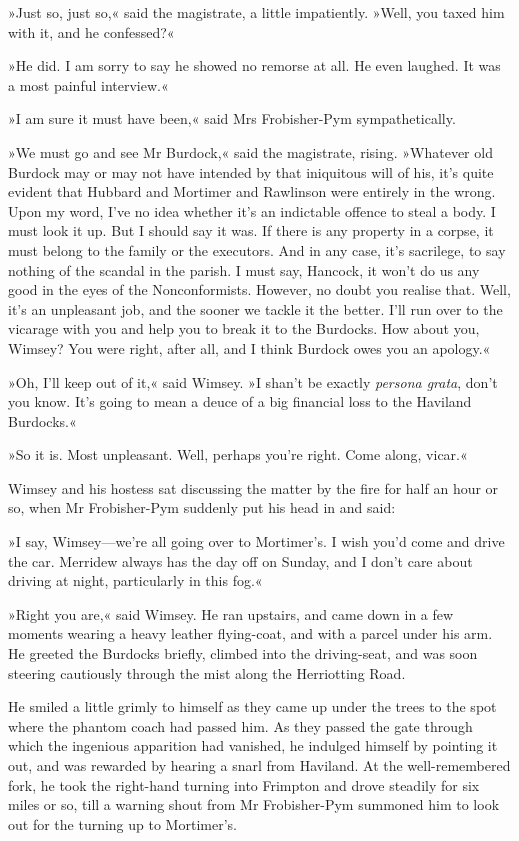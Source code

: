 »Just so, just so,« said the magistrate, a little impatiently. »Well, you taxed him with it, and he confessed?«

»He did. I am sorry to say he showed no remorse at all. He even laughed. It was a most painful interview.«

»I am sure it must have been,« said Mrs Frobisher-Pym sympathetically.

»We must go and see Mr Burdock,« said the magistrate, rising. »Whatever old Burdock may or may not have intended by that iniquitous will of his, it's quite evident that Hubbard and Mortimer and Rawlinson were entirely in the wrong. Upon my word, I've no idea whether it's an indictable offence to steal a body. I must look it up. But I should say it was. If there is any property in a corpse, it must belong to the family or the executors. And in any case, it's sacrilege, to say nothing of the scandal in the parish. I must say, Hancock, it won't do us any good in the eyes of the Nonconformists. However, no doubt you realise that. Well, it's an unpleasant job, and the sooner we tackle it the better. I'll run over to the vicarage with you and help you to break it to the Burdocks. How about you, Wimsey? You were right, after all, and I think Burdock owes you an apology.«

»Oh, I'll keep out of it,« said Wimsey. »I shan't be exactly \textit{persona grata}, don't you know. It's going to mean a deuce of a big financial loss to the Haviland Burdocks.«

»So it is. Most unpleasant. Well, perhaps you're right. Come along, vicar.«

Wimsey and his hostess sat discussing the matter by the fire for half an hour or so, when Mr Frobisher-Pym suddenly put his head in and said:

»I say, Wimsey—we're all going over to Mortimer's. I wish you'd come and drive the car. Merridew always has the day off on Sunday, and I don't care about driving at night, particularly in this fog.«

»Right you are,« said Wimsey. He ran upstairs, and came down in a few moments wearing a heavy leather flying-coat, and with a parcel under his arm. He greeted the Burdocks briefly, climbed into the driving-seat, and was soon steering cautiously through the mist along the Herriotting Road.

He smiled a little grimly to himself as they came up under the trees to the spot where the phantom coach had passed him. As they passed the gate through which the ingenious apparition had vanished, he indulged himself by pointing it out, and was rewarded by hearing a snarl from Haviland. At the well-remembered fork, he took the right-hand turning into Frimpton and drove steadily for six miles or so, till a warning shout from Mr Frobisher-Pym summoned him to look out for the turning up to Mortimer's.

